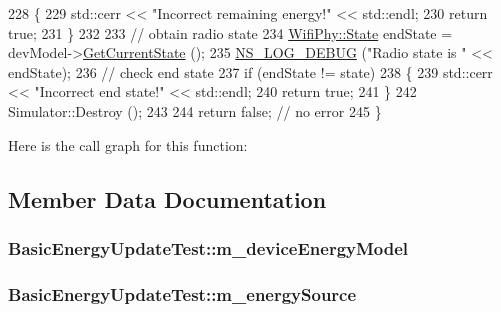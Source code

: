 \begin{DoxyCode}
228     \{
229       std::cerr << \textcolor{stringliteral}{"Incorrect remaining energy!"} << std::endl;
230       \textcolor{keywordflow}{return} \textcolor{keyword}{true};
231     \}
232 
233   \textcolor{comment}{// obtain radio state}
234   \hyperlink{classns3_1_1WifiPhy_af97408fa76f99797497b492758467143}{WifiPhy::State} endState = devModel->\hyperlink{classns3_1_1WifiRadioEnergyModel_a5e91c27bd230de0d77ce2d92d6466c63}{GetCurrentState} ();
235   \hyperlink{group__logging_ga413f1886406d49f59a6a0a89b77b4d0a}{NS\_LOG\_DEBUG} (\textcolor{stringliteral}{"Radio state is "} << endState);
236   \textcolor{comment}{// check end state}
237   \textcolor{keywordflow}{if} (endState != state)
238     \{
239       std::cerr << \textcolor{stringliteral}{"Incorrect end state!"} << std::endl;
240       \textcolor{keywordflow}{return} \textcolor{keyword}{true};
241     \}
242   Simulator::Destroy ();
243 
244   \textcolor{keywordflow}{return} \textcolor{keyword}{false}; \textcolor{comment}{// no error}
245 \}
\end{DoxyCode}


Here is the call graph for this function\+:




\subsection{Member Data Documentation}
\subsubsection[{\texorpdfstring{m\+\_\+device\+Energy\+Model}{m_deviceEnergyModel}}]{ Basic\+Energy\+Update\+Test\+::m\+\_\+device\+Energy\+Model\hspace{0.3cm}{\ttfamily [private]}}\hypertarget{classBasicEnergyUpdateTest_a8ae0adecca7e9f7d1db89ccb33dd5ae4}{}\label{classBasicEnergyUpdateTest_a8ae0adecca7e9f7d1db89ccb33dd5ae4}
\subsubsection[{\texorpdfstring{m\+\_\+energy\+Source}{m_energySource}}]{ Basic\+Energy\+Update\+Test\+::m\+\_\+energy\+Source\hspace{0.3cm}{\ttfamily [private]}}\hypertarget{classBasicEnergyUpdateTest_a6e597bf5827d66a852d1bac88278d648}{}\label{classBasicEnergyUpdateTest_a6e597bf5827d66a852d1bac88278d648}
